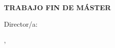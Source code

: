 \begin{titlepage}
\centering
{\large\MakeUppercase{\thesisuniversity}\par}
\vspace{0.5cm}
{\large\thesisschool\par}
\vspace{1.5cm}
{\Large\bfseries TRABAJO FIN DE MÁSTER\par}
\vspace{0.6cm}
{\large\thesisdegree\par}
\vfill
{\LARGE\bfseries\thesistitle\par}
\vfill
{\Large\thesisauthor\par}
\vspace{1cm}
{\large Director/a: \thesissupervisor\par}
\vspace{1cm}
{\large\thesiscity, \thesisdate\par}
\end{titlepage}
